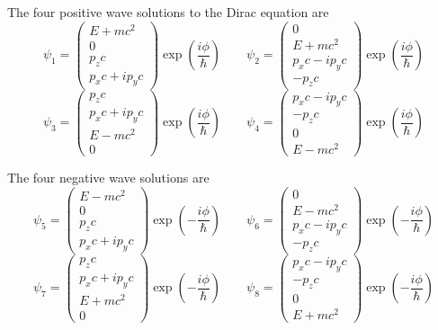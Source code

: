 \documentclass[12pt]{article}
\begin{document}
\noindent
The four positive wave solutions to the Dirac equation are
{\small
\begin{equation*}
\psi_1=\begin{pmatrix}E+mc^2\\0\\p_zc\\p_xc+ip_yc\end{pmatrix}
\exp\left(\frac{i\phi}{\hbar}\right)
\qquad
\psi_2=\begin{pmatrix}0\\E+mc^2\\p_xc-ip_yc\\-p_zc\end{pmatrix}
\exp\left(\frac{i\phi}{\hbar}\right)
\end{equation*}
\begin{equation*}
\psi_3=\begin{pmatrix}p_zc\\p_xc+ip_yc\\E-mc^2\\0\end{pmatrix}
\exp\left(\frac{i\phi}{\hbar}\right)
\qquad
\psi_4=\begin{pmatrix}p_xc-ip_yc\\-p_zc\\0\\E-mc^2\end{pmatrix}
\exp\left(\frac{i\phi}{\hbar}\right)
\end{equation*}
}

\noindent
The four negative wave solutions are
{\small
\begin{equation*}
\psi_5=\begin{pmatrix}E-mc^2\\0\\p_zc\\p_xc+ip_yc\end{pmatrix}
\exp\left(-\frac{i\phi}{\hbar}\right)
\qquad
\psi_6=\begin{pmatrix}0\\E-mc^2\\p_xc-ip_yc\\-p_zc\end{pmatrix}
\exp\left(-\frac{i\phi}{\hbar}\right)
\end{equation*}
\begin{equation*}
\psi_7=\begin{pmatrix}p_zc\\p_xc+ip_yc\\E+mc^2\\0\end{pmatrix}
\exp\left(-\frac{i\phi}{\hbar}\right)
\qquad
\psi_8=\begin{pmatrix}p_xc-ip_yc\\-p_zc\\0\\E+mc^2\end{pmatrix}
\exp\left(-\frac{i\phi}{\hbar}\right)
\end{equation*}
}
\end{document}
